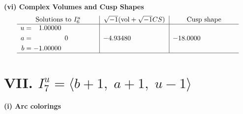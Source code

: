 \documentclass[1p]{elsarticle_modified}
\theoremstyle{definition}
\newcommand{\I}{\sqrt{-1}}
\begin{document}
\newpage\flushleft \textbf{(vi) Complex Volumes and Cusp Shapes}
$$\begin{array}{c|c|c}  
\text{Solutions to }I^u_{6}& \I (\text{vol} + \sqrt{-1}CS) & \text{Cusp shape}\\
 \hline 
\begin{aligned}
u &= \phantom{-}1.00000\phantom{ +0.000000I} \\
a &= \phantom{-0.000000 } 0 \\
b &= -1.00000\phantom{ +0.000000I}\end{aligned}
 & -4.93480\phantom{ +0.000000I} & -18.0000\phantom{ +0.000000I}\\
 \hline 
 \end{array}$$\newpage\newpage\renewcommand{\arraystretch}{1}
\centering \section*{VII. $I^u_{7}= \langle b+1,\;a+1,\;u-1 \rangle$}
\flushleft \textbf{(i) Arc colorings}\\
\end{document}
